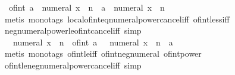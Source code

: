 \begin{isabellebody}
\ \ {\isachardoublequoteopen}of{\isacharunderscore}{\kern0pt}int\ a\ {\isacharless}{\kern0pt}\ numeral\ x\ {\isacharcircum}{\kern0pt}\ n\ {\isasymlongleftrightarrow}\ a\ {\isacharless}{\kern0pt}\ numeral\ x\ {\isacharcircum}{\kern0pt}\ n{\isachardoublequoteclose}\isanewline
%
\isadelimproof
\ \ %
\endisadelimproof
%
\isatagproof
{}\isamarkupfalse%
\ {\isacharparenleft}{\kern0pt}metis\ {\isacharparenleft}{\kern0pt}mono{\isacharunderscore}{\kern0pt}tags{\isacharparenright}{\kern0pt}\ local{\isachardot}{\kern0pt}of{\isacharunderscore}{\kern0pt}int{\isacharunderscore}{\kern0pt}eq{\isacharunderscore}{\kern0pt}numeral{\isacharunderscore}{\kern0pt}power{\isacharunderscore}{\kern0pt}cancel{\isacharunderscore}{\kern0pt}iff\ of{\isacharunderscore}{\kern0pt}int{\isacharunderscore}{\kern0pt}less{\isacharunderscore}{\kern0pt}iff{\isacharparenright}{\kern0pt}%
\endisatagproof
{\isafoldproof}%
%
\isadelimproof
\isanewline
%
\endisadelimproof
\isanewline
{}\isamarkupfalse%
\ neg{\isacharunderscore}{\kern0pt}numeral{\isacharunderscore}{\kern0pt}power{\isacharunderscore}{\kern0pt}le{\isacharunderscore}{\kern0pt}of{\isacharunderscore}{\kern0pt}int{\isacharunderscore}{\kern0pt}cancel{\isacharunderscore}{\kern0pt}iff\ {\isacharbrackleft}{\kern0pt}simp{\isacharbrackright}{\kern0pt}{\isacharcolon}{\kern0pt}\isanewline
\ \ {\isachardoublequoteopen}{\isacharparenleft}{\kern0pt}{\isacharminus}{\kern0pt}\ numeral\ x{\isacharparenright}{\kern0pt}\ {\isacharcircum}{\kern0pt}\ n\ {\isasymle}\ of{\isacharunderscore}{\kern0pt}int\ a\ {\isasymlongleftrightarrow}\ {\isacharparenleft}{\kern0pt}{\isacharminus}{\kern0pt}\ numeral\ x{\isacharparenright}{\kern0pt}\ {\isacharcircum}{\kern0pt}\ n\ {\isasymle}\ a{\isachardoublequoteclose}\isanewline
%
\isadelimproof
\ \ %
\endisadelimproof
%
\isatagproof
{}\isamarkupfalse%
\ {\isacharparenleft}{\kern0pt}metis\ {\isacharparenleft}{\kern0pt}mono{\isacharunderscore}{\kern0pt}tags{\isacharparenright}{\kern0pt}\ of{\isacharunderscore}{\kern0pt}int{\isacharunderscore}{\kern0pt}le{\isacharunderscore}{\kern0pt}iff\ of{\isacharunderscore}{\kern0pt}int{\isacharunderscore}{\kern0pt}neg{\isacharunderscore}{\kern0pt}numeral\ of{\isacharunderscore}{\kern0pt}int{\isacharunderscore}{\kern0pt}power{\isacharparenright}{\kern0pt}%
\endisatagproof
{\isafoldproof}%
%
\isadelimproof
\isanewline
%
\endisadelimproof
\isanewline
{}\isamarkupfalse%
\ of{\isacharunderscore}{\kern0pt}int{\isacharunderscore}{\kern0pt}le{\isacharunderscore}{\kern0pt}neg{\isacharunderscore}{\kern0pt}numeral{\isacharunderscore}{\kern0pt}power{\isacharunderscore}{\kern0pt}cancel{\isacharunderscore}{\kern0pt}iff\ {\isacharbrackleft}{\kern0pt}simp{\isacharbrackright}{\kern0pt}{\isacharcolon}{\kern0pt}\isanewline

\end{isabellebody}
